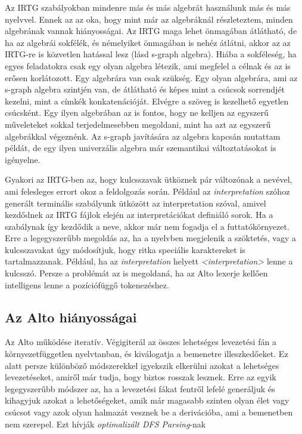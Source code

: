 Az IRTG szabályokban mindenre más és más algebrát használunk más és más nyelvvel. Ennek az az oka, hogy mint már az algebráknál részleteztem, minden algebrának vannak hiányosságai. Az IRTG maga lehet önmagában átlátható, de ha az algebrái sokfélék, és némelyiket önmagában is nehéz átlátni, akkor az az IRTG-re is közvetlen hatással lesz (lásd s-graph algebra). Hiába a sokféleség, ha egyes feladatokra csak egy olyan algebra létezik, ami megfelel a célnak és az is erősen korlátozott. Egy algebrára van csak szükség. Egy olyan algebrára, ami az s-graph algebra szintjén van, de átlátható és képes mint a csúcsok sorrendjét kezelni, mint a címkék konkatenációját. Elvégre a szöveg is kezelhető egyetlen csúcsként. Egy ilyen algebrában az is fontos, hogy ne kelljen az egyszerű műveleteket sokkal terjedelmesebben megoldani, mint ha azt az egyszerű algebrákkal végeznénk. Az s-graph javítására az algebra kapcsán mutattam példát, de egy ilyen univerzális algebra már szemantikai változtatásokat is igényelne.


Gyakori az IRTG-ben az, hogy kulcsszavak ütköznek pár változónak a nevével, ami felesleges errort okoz a feldolgozás során. 
Például az \textit{interpretation} szóhoz generált terminális szabályunk ütközött az interpretation szóval, amivel kezdődnek az IRTG fájlok elején az interpretációkat definiáló sorok. 
Ha a szabálynak így kezdődik a neve, akkor már nem fogadja el a futtatókörnyezet. 
Erre a legegyszerűbb megoldás az, ha a nyelvben megjelenik a szöktetés, vagy a kulcsszavakat úgy módosítjuk, hogy ritka speciális karaktereket is tartalmazzanak. 
Például, ha az \textit{interpretation} helyett \textit{<interpretation>} lenne a kulcsszó. 
Persze a problémát az is megoldaná, ha az Alto lexerje kellően intelligens lenne a pozíciófüggő tokenezéshez.

\subsection{Az Alto hiányosságai}
\label{sec:Altoshortcomming}

Az Alto működése iteratív. 
Végigiterál az összes lehetséges levezetési fán a környezetfüggetlen nyelvtanban, és kiválogatja a bemenetre illeszkedőeket. 
Ez alatt persze különböző módszerekkel igyekszik elkerülni azokat a lehetséges levezetéseket, amiről már tudja, hogy biztos rosszak lesznek. 
Erre az egyik legegyszerűbb módszer az, ha a levezetési fákat fentről lefelé generáljuk és kihagyjuk azokat a lehetőségeket, amik már magasabb szinten olyan élet vagy csúcsot vagy azok olyan halmazát vesznek be a derivációba, ami a bemenetben nem szerepel. 
Ezt hívják \textit{optimalizált DFS Parsing}-nak

